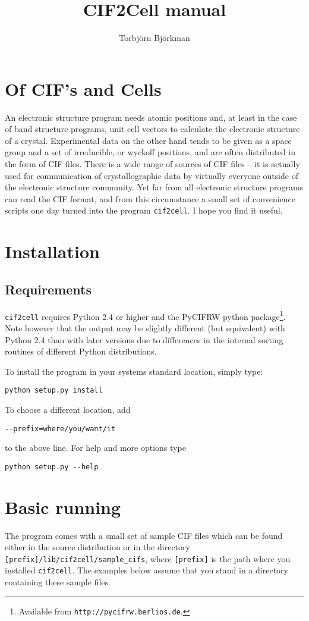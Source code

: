 \documentclass[11pt]{article}
\title{CIF2Cell manual}
\author{Torbj\"orn Bj\"orkman}
\newcommand{\ciftocell}{\texttt{cif2cell}}
\begin{document}
\maketitle
\section{Of CIF's and Cells}
An electronic structure program needs atomic positions and, at least in the case of band structure programs, unit cell vectors to calculate the electronic structure of a crystal. Experimental data on the other hand tends to be given as a space group and a set of irreducible, or wyckoff positions, and are often distributed in the form of CIF files. There is a wide range of sources of CIF files -- it is actually used for communication of crystallographic data by virtually everyone outside of the electronic structure community. Yet far from all electronic structure programs can read the CIF format, and from this circumstance a small set of convenience scripts one day turned into the program \ciftocell. I hope you find it useful.

\section{Installation}
\subsection{Requirements}
\ciftocell{} requires Python 2.4 or higher and the PyCIFRW python package\footnote{Available from \texttt{http://pycifrw.berlios.de}.}. Note however that the output may be slightly different (but equivalent) with Python 2.4 than with later versions due to differences in the internal sorting routines of different Python distributions.

To install the program in your systems standard location, simply type:
\begin{verbatim}
python setup.py install 
\end{verbatim}
To choose a different location, add 
\begin{verbatim}
--prefix=where/you/want/it 
\end{verbatim}
to the above line. For help and more options type
\begin{verbatim}
python setup.py --help
\end{verbatim}


\section{Basic running}
The program comes with a small set of sample CIF files which can be found either in the source distribution or in the directory \texttt{[prefix]/lib/cif2cell/sample\_cifs}, where \texttt{[prefix]} is the path where you installed \ciftocell. The examples below assume that you stand in a directory containing these sample files.
\end{document}
